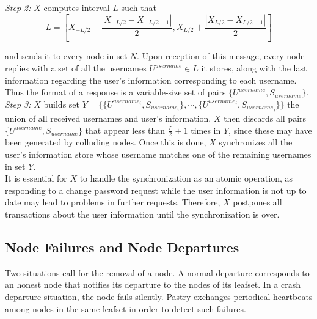 \textit{Step 2:} $X$ computes interval $L$ such that
$$
L = [ X_{-L/2} - \frac{| X_{-L/2} - X_{-L/2 +1} |}{2}, X_{L/2} +\frac{|
X_{L/2} - X_{L/2 -1} |}{2} ]
$$


and sends it to every node in set $N$. Upon reception of this message, every
node replies with a set of all the usernames $U^{username} \in L$ it
stores, along with the last information regarding the user's
information corresponding to each username. Thus the format of a response is a
variable-size set of pairs $\{ U^{username}, S_{username}\}$.\\


\textit{Step 3:} $X$ builds set 
$Y =  \{ \{U^{username_i}, S_{username_i}\},\cdots,\{ U^{username_j},
S_{username_j}\} \} $ the union of all received usernames and user's
information. $X$ then discards all pairs $\{ U^{username}, S_{username}\}$ that
appear less than $\frac{L}{2} +1$ times in $Y$, since these may have been
generated by colluding nodes. Once this is done, $X$ synchronizes all the
user's information store whose username matches one of the remaining usernames
in set $Y$.\\


It is essential for $X$ to handle the synchronization as an atomic operation,
as responding to a change password request while the user information is not up
to date may lead to problems in further requests. Therefore, $X$ postpones all
transactions about the user information until the synchronization is over.

\subsection{Node Failures and Node Departures}
\label{sec:node_failures_and_departures}
Two situations call for the removal of a node. A normal departure corresponds
to an honest node that notifies its departure to the nodes of its leafset. In a
crash departure situation, the node fails silently. Pastry exchanges
periodical heartbeats among nodes in the same leafset in order to detect such
failures.\\

